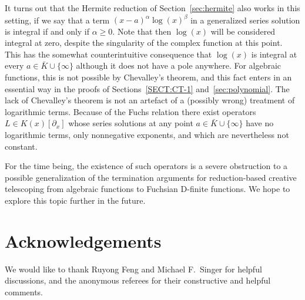 \documentclass{sig-alternate}
\begin{document}
It turns out that the Hermite reduction of Section~\ref{sec:hermite} also works in this setting, if we say that
a term $(x-a)^\alpha\log(x)^\beta$ in a generalized series solution is integral if and only if $\alpha\geq0$.
Note that then $\log(x)$ will be considered integral at zero, despite the singularity of the complex
function at this point. This has the somewhat counterintuitive consequence that $\log(x)$ is integral at
every $a\in\bar K\cup\{\infty\}$ although it does not have a pole anywhere. For algebraic functions,
this is not possible by Chevalley's theorem, and this fact enters in an essential way in the proofs of
Sections~\ref{SECT:CT-1} and~\ref{sec:polynomial}. The lack of Chevalley's theorem is not an artefact of a (possibly
wrong) treatment of logarithmic terms. Because of the Fuchs relation \cite[p.~241]{schlesinger95} there exist operators
$L\in K(x)[\partial_x]$ whose series solutions at any point $a\in\bar K\cup\{\infty\}$ have no logarithmic
terms, only nonnegative exponents, and which are nevertheless not constant.

For the time being, the existence of such operators is a severe obstruction to a possible generalization of
the termination arguments for reduction-based creative telescoping from algebraic functions to Fuchsian D-finite
functions. We hope to explore this topic further in the future.

\section*{Acknowledgements}

We would like to thank Ruyong Feng and Michael F.\ Singer for helpful discussions,
and the anonymous referees for their constructive and helpful comments.


%
%
\end{document}
